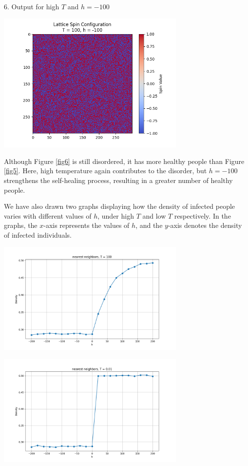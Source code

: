 \documentclass[11pt]{book}
\begin{document}
6. Output for high $T$ and $h=-100$
\begin{center}
\captionsetup{type=figure}
    \includegraphics[width=0.7\textwidth]{nn, T=100, h=-100.png}
    \label{fig6}
\end{center}
Although Figure \eqref{fig6} is still disordered, it has more healthy people than Figure \eqref{fig5}. Here, high temperature again contributes to the disorder, but $h = -100$ strengthens the self-healing process, resulting in a greater number of healthy people.


We have also drawn two graphs displaying how the density of infected people varies with different values of $h$, under high $T$ and low $T$ respectively. In the graphs, the $x$-axis represents the values of $h$, and the $y$-axis denotes the density of infected individuals.

\begin{center}
\captionsetup{type=figure}
    \includegraphics[width=0.7\textwidth]{nearest neighbors,T=100.jpg}
    \label{fig7}
\end{center}


\begin{center}
\captionsetup{type=figure}
    \includegraphics[width=0.7\textwidth]{nearest neighbors,T=0.01.jpg}
    \label{fig8}
\end{center}
\end{document}
